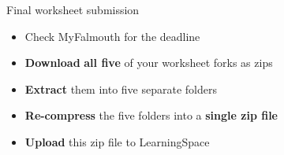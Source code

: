 \begin{frame}{Final worksheet submission}
	\begin{itemize}
		\item Check MyFalmouth for the deadline
		\item \textbf{Download} \textbf{all five} of your worksheet forks as zips
		\item \textbf{Extract} them into five separate folders
		\item \textbf{Re-compress} the five folders into a \textbf{single zip file}
		\item \textbf{Upload} this zip file to LearningSpace
	\end{itemize}
\end{frame}




